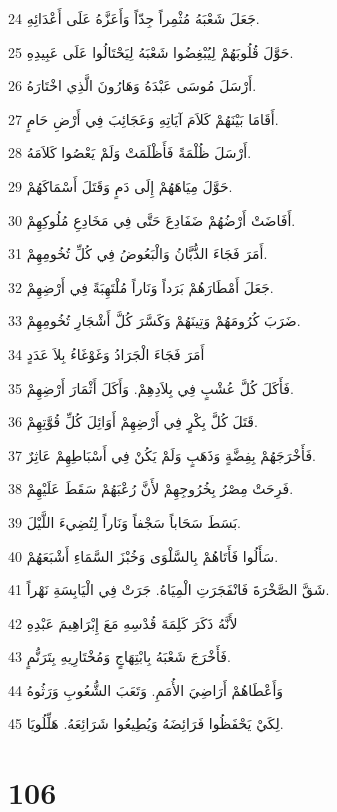 \par 24 جَعَلَ شَعْبَهُ مُثْمِراً جِدّاً وَأَعَزَّهُ عَلَى أَعْدَائِهِ.
\par 25 حَوَّلَ قُلُوبَهُمْ لِيُبْغِضُوا شَعْبَهُ لِيَحْتَالُوا عَلَى عَبِيدِهِ.
\par 26 أَرْسَلَ مُوسَى عَبْدَهُ وَهَارُونَ الَّذِي اخْتَارَهُ.
\par 27 أَقَامَا بَيْنَهُمْ كَلاَمَ آيَاتِهِ وَعَجَائِبَ فِي أَرْضِ حَامٍ.
\par 28 أَرْسَلَ ظُلْمَةً فَأَظْلَمَتْ وَلَمْ يَعْصُوا كَلاَمَهُ.
\par 29 حَوَّلَ مِيَاهَهُمْ إِلَى دَمٍ وَقَتَلَ أَسْمَاكَهُمْ.
\par 30 أَفَاضَتْ أَرْضُهُمْ ضَفَادِعَ حَتَّى فِي مَخَادِعِ مُلُوكِهِمْ.
\par 31 أَمَرَ فَجَاءَ الذُّبَّانُ وَالْبَعُوضُ فِي كُلِّ تُخُومِهِمْ.
\par 32 جَعَلَ أَمْطَارَهُمْ بَرَداً وَنَاراً مُلْتَهِبَةً فِي أَرْضِهِمْ.
\par 33 ضَرَبَ كُرُومَهُمْ وَتِينَهُمْ وَكَسَّرَ كُلَّ أَشْجَارِ تُخُومِهِمْ.
\par 34 أَمَرَ فَجَاءَ الْجَرَادُ وَغَوْغَاءُ بِلاَ عَدَدٍ
\par 35 فَأَكَلَ كُلَّ عُشْبٍ فِي بِلاَدِهِمْ. وَأَكَلَ أَثْمَارَ أَرْضِهِمْ.
\par 36 قَتَلَ كُلَّ بِكْرٍ فِي أَرْضِهِمْ أَوَائِلَ كُلِّ قُوَّتِهِمْ.
\par 37 فَأَخْرَجَهُمْ بِفِضَّةٍ وَذَهَبٍ وَلَمْ يَكُنْ فِي أَسْبَاطِهِمْ عَاثِرٌ.
\par 38 فَرِحَتْ مِصْرُ بِخُرُوجِهِمْ لأَنَّ رُعْبَهُمْ سَقَطَ عَلَيْهِمْ.
\par 39 بَسَطَ سَحَاباً سَجْفاً وَنَاراً لِتُضِيءَ اللَّيْلَ.
\par 40 سَأَلُوا فَأَتَاهُمْ بِالسَّلْوَى وَخُبْزَ السَّمَاءِ أَشْبَعَهُمْ.
\par 41 شَقَّ الصَّخْرَةَ فَانْفَجَرَتِ الْمِيَاهُ. جَرَتْ فِي الْيَابِسَةِ نَهْراً.
\par 42 لأَنَّهُ ذَكَرَ كَلِمَةَ قُدْسِهِ مَعَ إِبْرَاهِيمَ عَبْدِهِ
\par 43 فَأَخْرَجَ شَعْبَهُ بِابْتِهَاجٍ وَمُخْتَارِيهِ بِتَرَنُّمٍ.
\par 44 وَأَعْطَاهُمْ أَرَاضِيَ الأُمَمِ. وَتَعَبَ الشُّعُوبِ وَرَثُوهُ
\par 45 لِكَيْ يَحْفَظُوا فَرَائِضَهُ وَيُطِيعُوا شَرَائِعَهُ. هَلِّلُويَا.

\chapter{106}

